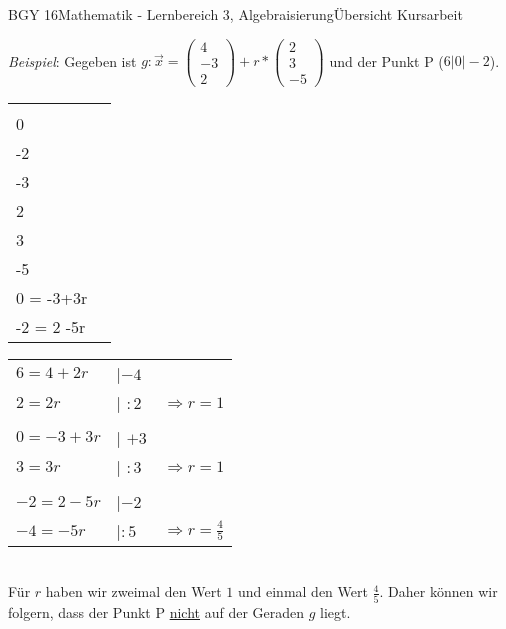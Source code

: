 \documentclass[oneside,openany,headings=optiontotoc,11pt,numbers=noenddot]{scrreprt}
\begin{document}
\begin{worksheet}{BGY 16}{Mathematik - Lernbereich 3, Algebraisierung}{Übersicht Kursarbeit}
\begin{framed}
			\textit{Beispiel}: Gegeben ist \(g: \vec{x} = \left(\begin{array}{c}4\\-3\\2\end{array}\right) + r*\left(\begin{array}{c}2\\3\\-5\end{array}\right)\) und der Punkt P (\(6|0|-2\)).\\
			\begin{tabularx}{\textwidth}{Xl}
				\(\left(\begin{array}{c}6\\0\\-2\end{array}\right) = \left(\begin{array}{c}4\\-3\\2\end{array}\right) + r*\left(\begin{array}{c}2\\3\\-5\end{array}\right)\) & \(\Rightarrow \begin{array}{c}6 = 4+2r\\0 = -3+3r\\-2 = 2 -5r\end{array}\)\\
			\end{tabularx}
			\begin{tabularx}{\textwidth}{lll}
				\hline
				\(6 = 4+2r\) & |\(-4\)\\
				\(2 = 2r\)& | \(:2\)& \(\Rightarrow r = 1\)\\
				\\
				\(0 = -3 +3r\) & | \(+3\)\\
				\(3 = 3r\) & | \(:3\) & \(\Rightarrow r = 1\)\\
				\\
				\(-2 = 2-5r\) & |\(-2\)\\
				\(-4 = -5r\) & |\(:5\) & \(\Rightarrow r = \frac{4}{5}\)
			\end{tabularx}\\
			Für \(r\) haben wir zweimal den Wert \(1\) und einmal den Wert \(\frac{4}{5}\). Daher können wir folgern, dass der Punkt P \underline{nicht} auf der Geraden \(g\) liegt.\\
			\par\bigskip\noindent

\end{framed}
\end{worksheet}
\end{document}
